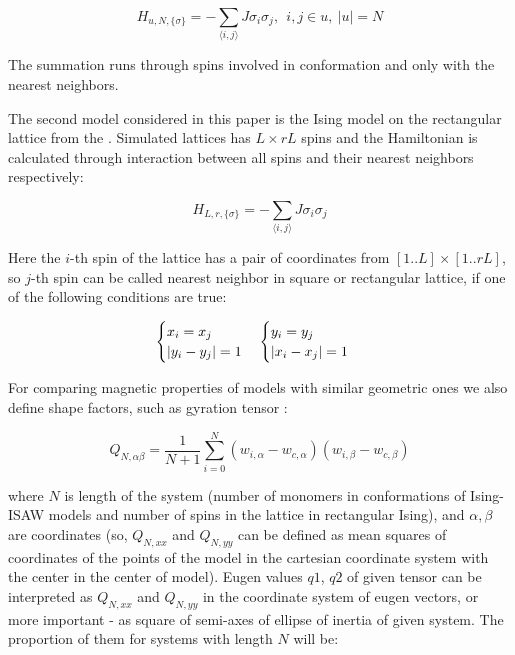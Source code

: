 \documentclass[aps,pre,amssymb,amsmath,twocolumn,floatfix]{revtex4-2}
\begin{document}
\begin{equation}\label{H_Ising_ISAW}
  H_{u, N, \{\sigma\}} = - \sum_{\langle i,j \rangle} J  \sigma_{i}  \sigma_{j},\ \ i,j \in u,\ |u| = N
\end{equation}

The summation runs through spins involved in conformation and only with the nearest neighbors. 

The second model considered in this paper is the Ising model on the rectangular lattice from the \cite{Selke2006}. Simulated lattices has $L \times rL$ spins and the Hamiltonian is calculated through interaction between all spins and their nearest neighbors respectively:

\begin{equation}\label{H_Ising_Rectan}
  H_{L, r, \{\sigma\}} = - \sum_{\langle i,j \rangle} J  \sigma_{i}  \sigma_{j}
\end{equation}

Here the $i$-th spin of the lattice has a pair of coordinates from $[1..L] \times [1..rL]$, so $j$-th spin can be called nearest neighbor in square or rectangular lattice, if one of the following conditions are true:

\begin{equation*}
\centering
    \begin{cases}
    x_{i} = x_{j} \\
    |y_{i} - y_{j}| = 1\\
    \end{cases} 
    \begin{cases}
    y_{i} = y_{j} \\
    |x_{i} - x_{j}| = 1\\
    \end{cases} 
\end{equation*}

For comparing magnetic properties of models with similar geometric ones we also define shape factors, such as gyration tensor \cite{Caracciolo_2011}:

\begin{equation}\label{eq:Ten_G1}
    Q_{N,\alpha\beta} = \frac{1}{N+1} \sum^{N}_{i=0}(w_{i,\alpha} - w_{c, \alpha})(w_{i,\beta} - w_{c, \beta})
\end{equation}

where $N$ is length of the system (number of monomers in conformations of Ising-ISAW models and number of spins in the lattice in rectangular Ising), and  $\alpha,\beta$ are coordinates (so, $Q_{N, xx}$ and $Q_{N,yy}$ can be defined as mean squares of coordinates of the points of the model in the cartesian coordinate system with the center in the center of model). Eugen values $q1$, $q2$ of given tensor can be interpreted as $Q_{N, xx}$ and $Q_{N,yy}$ in the coordinate system of eugen vectors, or more important - as square of semi-axes of ellipse of inertia of given system. The proportion of them for systems with length $N$ will be\cite{Caracciolo_2011}: 
\end{document}
